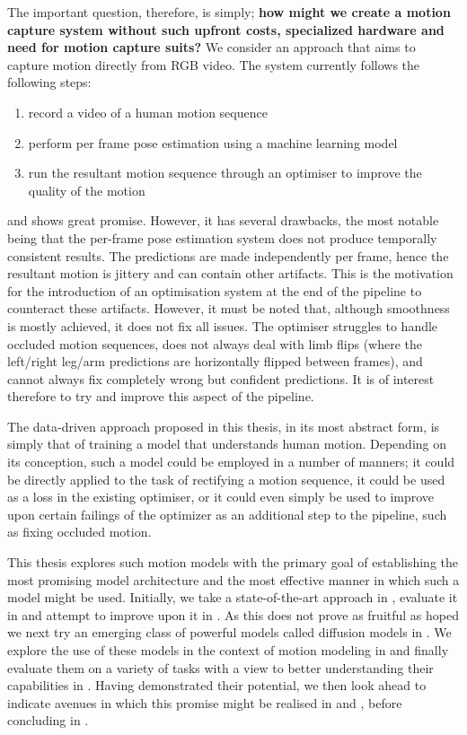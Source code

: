 The important question, therefore, is simply; \textbf{how might we create a motion capture system without such upfront costs, specialized hardware and need for motion capture suits?}
We consider an approach that aims to capture motion directly from RGB video. The system currently follows the following steps:
\begin{enumerate}
    \item record a video of a human motion sequence
    \item perform per frame pose estimation using a machine learning model
    \item run the resultant motion sequence through an optimiser to improve the quality of the motion
\end{enumerate}
and shows great promise. However, it has several drawbacks,
the most notable being that the per-frame pose estimation system does not produce temporally consistent results. The predictions are made independently per frame, hence the resultant motion is jittery and can contain other artifacts. This is the motivation for the introduction of an optimisation system at the end of the pipeline to counteract these artifacts. However, it must be noted that, although smoothness is mostly achieved, it does not fix all issues. The optimiser struggles to handle occluded motion sequences, does not always deal with limb flips (where the left/right leg/arm predictions are horizontally flipped between frames), and cannot always fix completely wrong but confident predictions. It is of interest therefore to try and improve this aspect of the pipeline.

The data-driven approach proposed in this thesis, in its most abstract form, is simply that of training a model that understands human motion. Depending on its conception, such a model could be employed in a number of manners; it could be directly applied to the task of rectifying a motion sequence, it could be used as a loss in the existing optimiser, or it could even simply be used to improve upon certain failings of the optimizer as an additional step to the pipeline, such as fixing occluded motion.

This thesis explores such motion models with the primary goal of establishing the most promising model architecture and the most effective manner in which such a model might be used. Initially, we take a state-of-the-art approach in , evaluate it in  and attempt to improve upon it in . As this does not prove as fruitful as hoped we next try an emerging class of powerful models called diffusion models in . We explore the use of these models in the context of motion modeling in  and finally evaluate them on a variety of tasks with a view to better understanding their capabilities in . Having demonstrated their potential, we then look ahead to indicate avenues in which this promise might be realised in  and , before concluding in .
